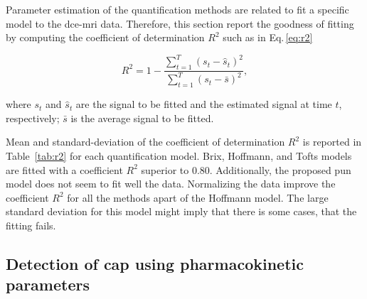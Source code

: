 Parameter estimation of the quantification methods are related to fit a specific model to the \ac{dce}-\ac{mri} data.
Therefore, this section report the goodness of fitting by computing the coefficient of determination $R^2$ such as in Eq.\,\eqref{eq:r2}

\begin{equation}
  R^2 = 1 - \frac{\sum_{t = 1}^{T} (s_t - \hat{s}_t)^2}{\sum_{t = 1}^{T} (s_t - \bar{s})^2} ,
  \label{eq:r2}
\end{equation}

\noindent where $s_t$ and $\hat{s}_t$ are the signal to be fitted and the estimated signal at time $t$, respectively; $\bar{s}$ is the average signal to be fitted.

Mean and standard-deviation of the coefficient of determination $R^{2}$ is reported in Table~\ref{tab:r2} for each quantification model.
Brix, Hoffmann, and Tofts models are fitted with a coefficient $R^{2}$ superior to 0.80.
Additionally, the proposed \ac{pun} model does not seem to fit well the data.
Normalizing the data improve the coefficient $R^2$ for all the methods apart of the Hoffmann model.
The large standard deviation for this model might imply that there is some cases, that the fitting fails.

\subsection{Detection of \acs*{cap} using pharmacokinetic parameters}

